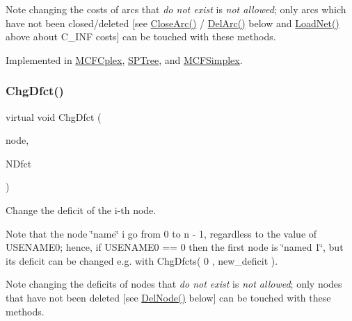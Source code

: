 \begin{DoxyNote}{Note}
changing the costs of arcs that {\itshape do not exist} is {\itshape not allowed}; only arcs which have not been closed/deleted \mbox{[}see \mbox{\hyperlink{class_m_c_f_class_ae1c33ba491b57343fbc157123fff5b11}{Close\+Arc()}} / \mbox{\hyperlink{class_m_c_f_class_ae291d6625ff31a5fdcc1ef166e2dee34}{Del\+Arc()}} below and \mbox{\hyperlink{class_m_c_f_class_a8d82d26f7845eb69081c860e14c3dc4c}{Load\+Net()}} above about C\+\_\+\+I\+NF costs\mbox{]} can be touched with these methods. 
\end{DoxyNote}


Implemented in \mbox{\hyperlink{class_m_c_f_cplex_a1f8f2db739c0307ee7f4383972821e12}{M\+C\+F\+Cplex}}, \mbox{\hyperlink{class_s_p_tree_a8f213278dffbfd9008e7c175951c1d89}{S\+P\+Tree}}, and \mbox{\hyperlink{class_m_c_f_simplex_a1f8f2db739c0307ee7f4383972821e12}{M\+C\+F\+Simplex}}.

\mbox{\label{class_m_c_f_class_a5ae235c4b587c8cffb777719c9221970}} 
\subsubsection{\texorpdfstring{Chg\+Dfct()}{ChgDfct()}}
{\footnotesize\ttfamily virtual void Chg\+Dfct (\begin{DoxyParamCaption}\item[{\mbox{\hyperlink{class_m_c_f_class_ad53d6229d7ec28555a9c9c2fd9abf773}{Index}}}]{node,  }\item[{\mbox{\hyperlink{class_m_c_f_class_a11f747fbdff346237c8db4469d569994}{c\+F\+Number}}}]{N\+Dfct }\end{DoxyParamCaption})\hspace{0.3cm}{\ttfamily [pure virtual]}}

Change the deficit of the i-\/th node.

Note that the node \char`\"{}name\char`\"{} i go from 0 to n -\/ 1, regardless to the value of U\+S\+E\+N\+A\+M\+E0; hence, if U\+S\+E\+N\+A\+M\+E0 == 0 then the first node is \char`\"{}named 1\char`\"{}, but its deficit can be changed e.\+g. with Chg\+Dfcts( 0 , new\+\_\+deficit ).

\begin{DoxyNote}{Note}
changing the deficits of nodes that {\itshape do not exist} is {\itshape not allowed}; only nodes that have not been deleted \mbox{[}see \mbox{\hyperlink{class_m_c_f_class_abecb8b32d512eea7daafba0e06ab4742}{Del\+Node()}} below\mbox{]} can be touched with these methods. 
\end{DoxyNote}


